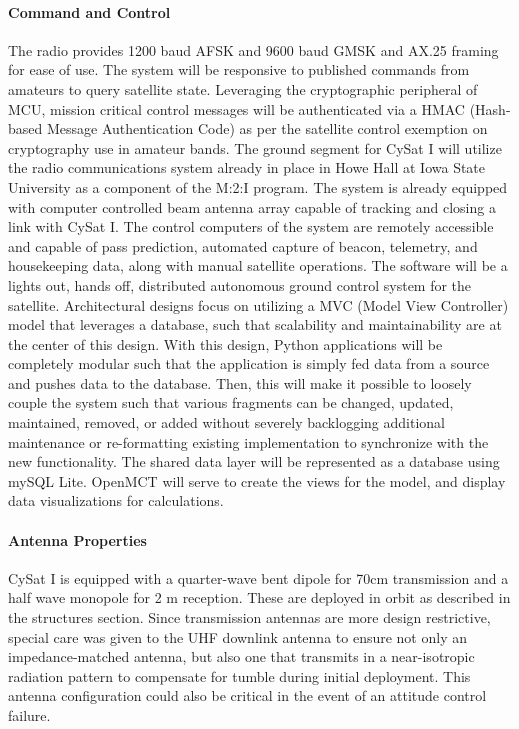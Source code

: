 \documentclass[nocover]            %
{CSLI}                       %
\begin{document}
\paragraph{Command and Control\\}

The radio provides 1200 baud AFSK and 9600 baud GMSK and AX.25 framing for ease of use. The system will be responsive to published commands from amateurs to query satellite state. Leveraging the cryptographic peripheral of MCU, mission critical control messages will be authenticated via a HMAC (Hash-based Message Authentication Code) as per the satellite control exemption on cryptography use in amateur bands. The ground segment for CySat I will utilize the radio communications system already in place in Howe Hall at Iowa State University as a component of the M:2:I program. The system is already equipped with computer controlled beam antenna array capable of tracking and closing a link with CySat I. The control computers of the system are remotely accessible and capable of pass prediction, automated capture of beacon, telemetry, and housekeeping data, along with manual satellite operations. The software will be a lights out, hands off, distributed autonomous ground control system for the satellite. Architectural designs focus on utilizing a MVC (Model View Controller) model that leverages a database, such that scalability and maintainability are at the center of this design. With this design, Python applications will be completely modular such that the application is simply fed data from a source and pushes data to the database. Then, this will make it possible to loosely couple the system such that various fragments can be changed, updated, maintained, removed, or added without severely backlogging additional maintenance or re-formatting existing implementation to synchronize with the new functionality. The shared data layer will be represented as a database using mySQL Lite. OpenMCT will serve to create the views for the model, and display data visualizations for calculations.

\paragraph{Antenna Properties\\}

CySat I is equipped with a quarter-wave bent dipole for 70cm transmission and a half wave monopole for 2 m reception. These are deployed in orbit as described in the structures section. Since transmission antennas are more design restrictive, special care was given to the UHF downlink antenna to ensure not only an impedance-matched antenna, but also one that transmits in a near-isotropic radiation pattern to compensate for tumble during initial deployment. This antenna configuration could also be critical in the event of an attitude control failure.
\end{document}
